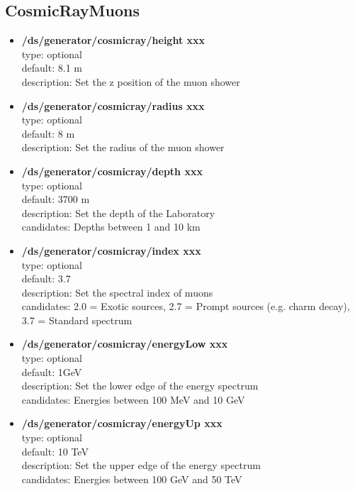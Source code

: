 \documentclass[twocolumn, 10pt]{article}
\begin{document}
\subsection{CosmicRayMuons}
\begin{itemize}

\item \textbf{/ds/generator/cosmicray/height xxx}\\
type: optional \\
default: 8.1 m \\
description: Set the z position of the muon shower\\

\item \textbf{/ds/generator/cosmicray/radius xxx}\\
type: optional\\
default: 8 m\\
description: Set the radius of the muon shower \\

\item \textbf{/ds/generator/cosmicray/depth xxx}\\
type: optional \\
default: 3700 m\\
description: Set the depth of the Laboratory\\
candidates: Depths between 1 and 10 km\\

\item \textbf{/ds/generator/cosmicray/index xxx}\\
type: optional \\
default: 3.7\\
description: Set the spectral index of muons\\
candidates: 2.0 = Exotic sources, 2.7 = Prompt sources (e.g. charm decay), 3.7 = Standard spectrum \\

\item \textbf{/ds/generator/cosmicray/energyLow xxx}\\
type: optional \\
default: 1GeV \\
description: Set the lower edge of the energy spectrum\\
candidates: Energies between 100 MeV and 10 GeV\\

\item \textbf{/ds/generator/cosmicray/energyUp xxx}\\
type: optional \\
default: 10 TeV\\
description: Set the upper edge of the energy spectrum\\
candidates: Energies between 100 GeV and 50 TeV\\


\end{itemize}
\end{document}
